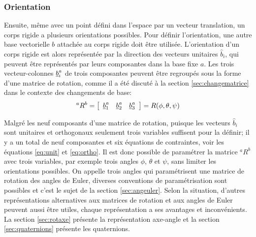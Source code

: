 \subsubsection{Orientation}
%
Ensuite, même avec un point défini dans l'espace par un vecteur translation, un corps rigide a plusieurs orientations possibles. Pour définir l'orientation, une autre base vectorielle $b$ attachée au corps rigide doit être utilisée. L'orientation d'un corps rigide est alors représentée par la direction des vecteurs unitaires $\hat{b}_i$, qui peuvent être représentés par leurs composantes dans la base fixe $a$. Les trois vecteur-colonnes $\underline{b}_i^a$ de trois composantes peuvent être regroupés sous la forme d'une matrice de rotation, comme il a été discuté à la section \ref{sec:changematrice} dans le contexte des changements de base:
\begin{equation}
^aR^b = \left[ \begin{array}{ c c c } \underline{b}_1^a &  \underline{b}_2^a & \underline{b}_3^a  \end{array} \right] = R(\phi,\theta,\psi)
\end{equation} 

Malgré les neuf composants d'une matrice de rotation, puisque les vecteurs $\hat{b}_i$ sont unitaires et orthogonaux seulement trois variables suffisent pour la définir; il y a un total de neuf composantes et six équations de contraintes, voir les équations \eqref{eq:unit} et \eqref{eq:ortho}. Il est donc possible de paramétrer la matrice $^aR^b$ avec trois variables, par exemple trois angles $\phi$, $\theta$ et $\psi$, sans limiter les orientations possibles. On appelle trois angles qui paramétrisent une matrice de rotation des angles de Euler, diverses conventions de paramétrisation sont possibles et c'est le sujet de la section \ref{sec:angeuler}. Selon la situation, d'autres représentations alternatives aux matrices de rotation et aux angles de Euler peuvent aussi être utiles, chaque représentation a ses avantages et inconvénients. La section \ref{sec:rotaxe} présente la représentation axe-angle et la section \ref{sec:quaternions} présente les quaternions. 


